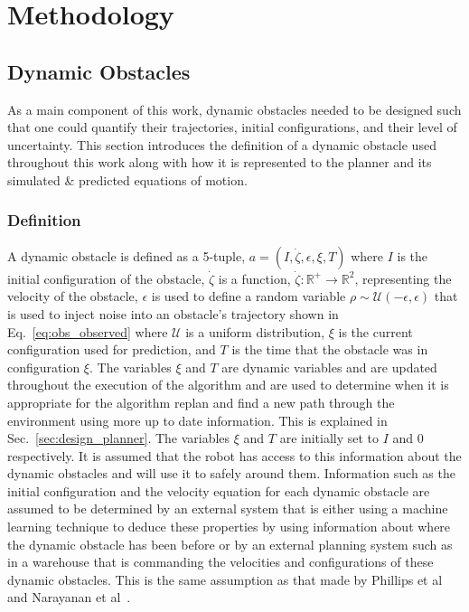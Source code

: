 


\chapter{Methodology}

\label{chapter:methodology}

\section{Dynamic Obstacles}

As a main component of this work, dynamic obstacles needed to be designed such
that one could quantify their trajectories, initial configurations, and their
level of uncertainty. This section introduces the definition of a dynamic
obstacle used throughout this work along with how it is represented to the
planner and its simulated \& predicted equations of motion.

\subsection{Definition}

A dynamic obstacle is defined as a 5-tuple, $a = (I, \dot{\zeta},
\epsilon, \xi, T)$ where $I$ is the initial configuration of the obstacle,
$\dot{\zeta}$ is a function, $\dot{\zeta}: \mathbb{R}^+ \rightarrow
\mathbb{R}^2$, representing the velocity of the obstacle, $\epsilon$ is used to
define a random variable $\rho \sim \mathcal{U}(-\epsilon, \epsilon)$ that is
used to inject noise into an obstacle's trajectory shown in
Eq.~\ref{eq:obs_observed} where $\mathcal{U}$ is a uniform distribution, $\xi$
is the current configuration used for prediction, and $T$ is the time that the
obstacle was in configuration $\xi$.  The variables $\xi$ and $T$ are dynamic
variables and are updated throughout the execution of the algorithm and are
used to determine when it is appropriate for the algorithm replan and find a
new path through the environment using more up to date information. This is
explained in Sec.~\ref{sec:design_planner}. The variables $\xi$ and $T$ are
initially set to $I$ and $0$ respectively. It is assumed that the robot has
access to this information about the dynamic obstacles and will use it to
safely around them.  Information such as the initial configuration and the
velocity equation for each dynamic obstacle are assumed to be determined by an
external system that is either using a machine learning technique to deduce
these properties by using information about where the dynamic obstacle has been
before or by an external planning system such as in a warehouse that is
commanding the velocities and configurations of these dynamic obstacles. This
is the same assumption as that made by Phillips et al~\cite{sipp} and Narayanan
et al~\cite{asipp}.

